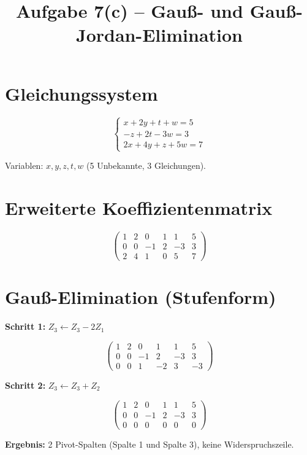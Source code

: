 \documentclass[a4paper,12pt]{article}
\title{Aufgabe 7(c) -- Gauß- und Gauß-Jordan-Elimination}
\author{}
\date{}
\begin{document}
\maketitle

\section*{Gleichungssystem}

\[
\begin{cases}
x + 2y + t + w = 5 \\
-z + 2t - 3w = 3 \\
2x + 4y + z + 5w = 7
\end{cases}
\]

Variablen: $x, y, z, t, w$ (5 Unbekannte, 3 Gleichungen).

\section*{Erweiterte Koeffizientenmatrix}

\[
\left(\begin{array}{ccccc|c}
1 & 2 & 0 & 1 & 1 & 5 \\
0 & 0 & -1 & 2 & -3 & 3 \\
2 & 4 & 1 & 0 & 5 & 7
\end{array}\right)
\]

\section*{Gauß-Elimination (Stufenform)}

\textbf{Schritt 1:} $Z_3 \leftarrow Z_3 - 2Z_1$

\[
\left(\begin{array}{ccccc|c}
1 & 2 & 0 & 1 & 1 & 5 \\
0 & 0 & -1 & 2 & -3 & 3 \\
0 & 0 & 1 & -2 & 3 & -3
\end{array}\right)
\]

\textbf{Schritt 2:} $Z_3 \leftarrow Z_3 + Z_2$

\[
\left(\begin{array}{ccccc|c}
1 & 2 & 0 & 1 & 1 & 5 \\
0 & 0 & -1 & 2 & -3 & 3 \\
0 & 0 & 0 & 0 & 0 & 0
\end{array}\right)
\]

\textbf{Ergebnis:} 2 Pivot-Spalten (Spalte 1 und Spalte 3), keine Widerspruchszeile.
\end{document}
